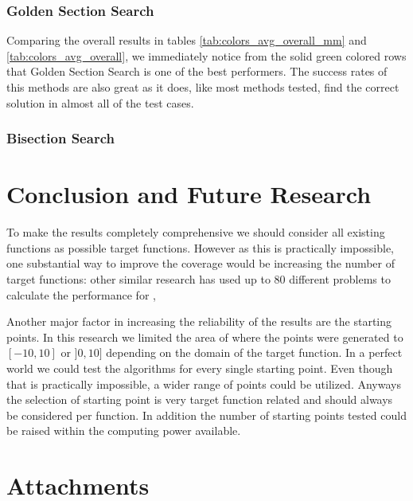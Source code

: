 \documentclass[a4paper,english,titlepage,12pt]{article}
\begin{document}
\subsubsection*{Golden Section Search}

Comparing the overall results in tables \ref{tab:colors_avg_overall_mm} and \ref{tab:colors_avg_overall}, we immediately notice from the solid green colored rows that Golden Section Search is one of the best performers. The success rates of this methods are also great as it does, like most methods tested, find the correct solution in almost all of the test cases.

\subsubsection*{Bisection Search}




\section{Conclusion and Future Research}


To make the results completely comprehensive we should consider all existing functions as possible target functions. However as this is practically impossible, one substantial way to improve the coverage would be increasing the number of target functions: other similar research has used up to 80 different problems to calculate the performance for \cite{monotone_line_search_performance},

Another major factor in increasing the reliability of the results are the starting points. In this research we limited the area of where the points were generated to $[-10, 10]$ or $]0, 10]$ depending on the domain of the target function. In a perfect world we could test the algorithms for every single starting point. Even though that is practically impossible, a wider range of points could be utilized. Anyways the selection of starting point is very target function related and should always be considered per function. In addition the number of starting points tested could be raised within the computing power available.


\newpage
% 






\newpage
\section{Attachments}

\end{document}
